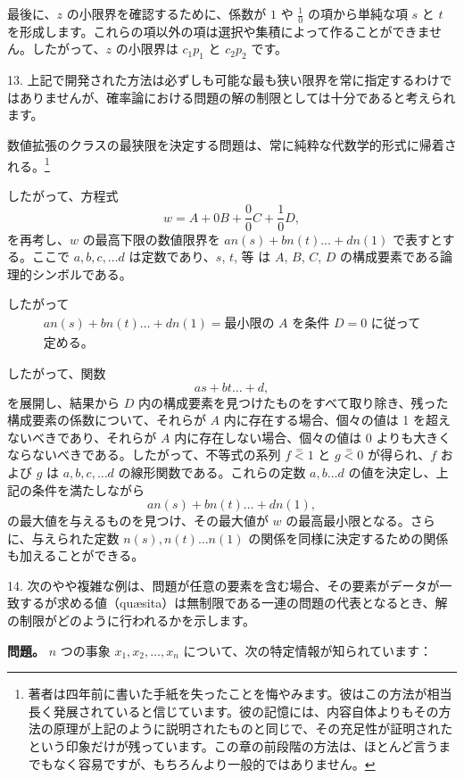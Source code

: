 \documentclass[a4paper,11pt,openany]{ltjsbook}
\begin{document}
最後に、$z$ の小限界を確認するために、係数が $1$ や $\frac{1}{0}$ の項から単純な項 $s$ と $t$ を形成します。これらの項以外の項は選択や集積によって作ることができません。したがって、$z$ の小限界は $c_1p_1$ と $c_2p_2$ です。

13. 上記で開発された方法は必ずしも可能な最も狭い限界を常に指定するわけではありませんが、確率論における問題の解の制限としては十分であると考えられます。

数値拡張のクラスの最狭限を決定する問題は、常に純粋な代数学的形式に帰着される。\footnote{著者は四年前に書いた手紙を失ったことを悔やみます。彼はこの方法が相当長く発展されていると信じています。彼の記憶には、内容自体よりもその方法の原理が上記のように説明されたものと同じで、その充足性が証明されたという印象だけが残っています。この章の前段階の方法は、ほとんど言うまでもなく容易ですが、もちろんより一般的ではありません。}

したがって、方程式
\[
  w = A + 0B + \frac{0}{0}C + \frac{1}{0}D,
\]
を再考し、$w$ の最高下限の数値限界を $an(s) + bn(t) \dotsc + dn(1)$ で表すとする。ここで $a, b, c,\dotsc d$ は定数であり、$s$, $t$, 等 は $A$, $B$, $C$, $D$ の構成要素である論理的シンボルである。

したがって
\[
\begin{split}
an(s) + bn(t)\dotsc + dn(1)=\text{最小限の $A$ を条件 $D = 0$ に従って}\\
\text{定める}。
\end{split}
\]

したがって、関数
\[
  as + bt \dotsc + d,
\]
を展開し、結果から $D$ 内の構成要素を見つけたものをすべて取り除き、残った構成要素の係数について、それらが $A$ 内に存在する場合、個々の値は 1 を超えないべきであり、それらが $A$ 内に存在しない場合、個々の値は 0 よりも大きくならないべきである。したがって、不等式の系列
$f \stackrel{=}{<} 1$
と
$g \stackrel{=}{<} 0$
が得られ、$f$ および $g$ は $a, b, c,\dotsc d$ の線形関数である。これらの定数 $a, b \dotsc d$ の値を決定し、上記の条件を満たしながら
\[
  an(s) + bn(t) \dotsc + dn(1),
\]
の最大値を与えるものを見つけ、その最大値が $w$ の最高最小限となる。さらに、与えられた定数 $n(s), n(t) \dotsc n(1)$ の関係を同様に決定するための関係も加えることができる。

14. 次のやや複雑な例は、問題が任意の要素を含む場合、その要素がデータが一致するが求める値（qu{\ae}sita）は無制限である一連の問題の代表となるとき、解の制限がどのように行われるかを示します。

\textbf{問題。} $n$ つの事象 $x_1, x_2, \dotsc, x_n$ について、次の特定情報が知られています：
\end{document}
